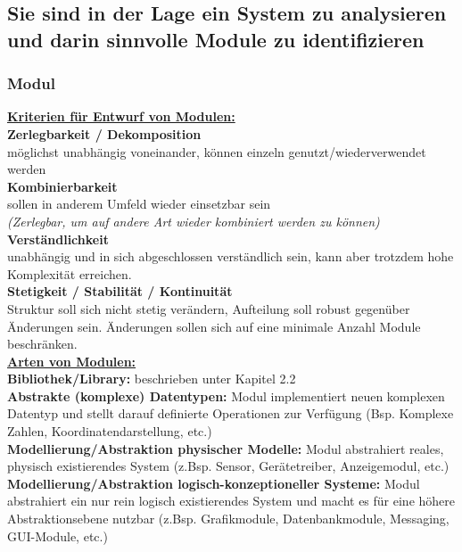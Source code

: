 \documentclass[a4paper]{article}
\begin{document}
	\newpage
	\subsection{Sie sind in der Lage ein System zu analysieren und darin sinnvolle Module zu identifizieren}
	
	\subsubsection{Modul}
	\textbf{\underline{Kriterien für Entwurf von Modulen:}}\\
	\textbf{Zerlegbarkeit / Dekomposition}\\
	möglichst unabhängig voneinander, können einzeln genutzt/wiederverwendet werden\\
	\textbf{Kombinierbarkeit}\\
	sollen in anderem Umfeld wieder einsetzbar sein \\
	\textit{(Zerlegbar, um auf andere Art wieder kombiniert werden zu können)}\\
	\textbf{Verständlichkeit}\\
	unabhängig und in sich abgeschlossen verständlich sein, kann aber trotzdem hohe Komplexität erreichen.\\
	\textbf{Stetigkeit / Stabilität / Kontinuität}\\
	Struktur soll sich nicht stetig verändern, Aufteilung soll robust gegenüber Änderungen sein. Änderungen sollen sich auf eine minimale Anzahl Module beschränken.\\
	\newline
	\textbf{\underline{Arten von Modulen:}}\\
	\textbf{Bibliothek/Library:} beschrieben unter Kapitel 2.2\\
	\textbf{Abstrakte (komplexe) Datentypen:} Modul implementiert neuen komplexen Datentyp und stellt darauf definierte Operationen zur Verfügung (Bsp. Komplexe Zahlen, Koordinatendarstellung, etc.)\\
	\textbf{Modellierung/Abstraktion physischer Modelle:} Modul abstrahiert reales, physisch existierendes System (z.Bsp. Sensor, Gerätetreiber, Anzeigemodul, etc.)\\
	\textbf{Modellierung/Abstraktion logisch-konzeptioneller Systeme:} Modul abstrahiert ein nur rein logisch existierendes System und macht es für eine höhere Abstraktionsebene nutzbar (z.Bsp. Grafikmodule, Datenbankmodule, Messaging, GUI-Module, etc.)\\
	\newline
\end{document}

